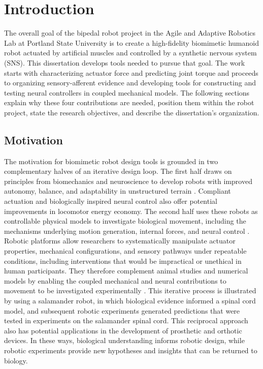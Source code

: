 \chapter{Introduction}\label{ch:introduction}
\graphicspath{{../Figures/10-introduction/}{figs/10-introduction/}}

The overall goal of the bipedal robot project in the Agile and Adaptive Robotics Lab at Portland State University is to create a high-fidelity biomimetic humanoid robot actuated by artificial muscles and controlled by a synthetic nervous system (SNS). This dissertation develops tools needed to pursue that goal. The work starts with characterizing actuator force and predicting joint torque and proceeds to organizing sensory-afferent evidence and developing tools for constructing and testing neural controllers in coupled mechanical models. The following sections explain why these four contributions are needed, position them within the robot project, state the research objectives, and describe the dissertation's organization.

\section{Motivation}

The motivation for biomimetic robot design tools is grounded in two complementary halves of an iterative design loop. The first half draws on principles from biomechanics and neuroscience to develop robots with improved autonomy, balance, and adaptability in unstructured terrain \citep{frey_legged_2026, ha_learning_2025, ijspeert_amphibious_2020}. Compliant actuation and biologically inspired neural control also offer potential improvements in locomotor energy economy. The second half uses these robots as controllable physical models to investigate biological movement, including the mechanisms underlying motion generation, internal forces, and neural control \citep{asano_design_2017, hitzmann_anthropomorphic_2018}. Robotic platforms allow researchers to systematically manipulate actuator properties, mechanical configurations, and sensory pathways under repeatable conditions, including interventions that would be impractical or unethical in human participants. They therefore complement animal studies and numerical models by enabling the coupled mechanical and neural contributions to movement to be investigated experimentally \citep{shin_constructive_2018, goldsmith_investigating_2021}. This iterative process is illustrated by \citet{ijspeert_swimming_2007} using a salamander robot, in which biological evidence informed a spinal cord model, and subsequent robotic experiments generated predictions that were tested in experiments on the salamander spinal cord. This reciprocal approach also has potential applications in the development of prosthetic and orthotic devices. In these ways, biological understanding informs robotic design, while robotic experiments provide new hypotheses and insights that can be returned to biology. 

